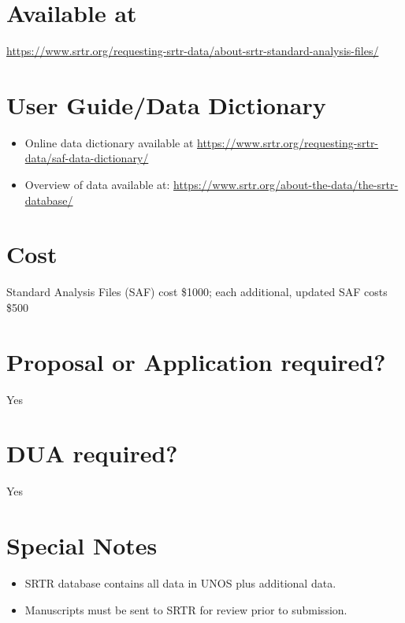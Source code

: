 \documentclass[
]{book}
\providecommand{\tightlist}{%
  \setlength{\itemsep}{0pt}\setlength{\parskip}{0pt}}
\begin{document}
\hypertarget{available-at-76}{%
\section{Available at}\label{available-at-76}}

\url{https://www.srtr.org/requesting-srtr-data/about-srtr-standard-analysis-files/}

\hypertarget{user-guidedata-dictionary-76}{%
\section{User Guide/Data Dictionary}\label{user-guidedata-dictionary-76}}

\begin{itemize}
\tightlist
\item
  Online data dictionary available at \url{https://www.srtr.org/requesting-srtr-data/saf-data-dictionary/}
\item
  Overview of data available at: \url{https://www.srtr.org/about-the-data/the-srtr-database/}
\end{itemize}

\hypertarget{cost-76}{%
\section{Cost}\label{cost-76}}

Standard Analysis Files (SAF) cost \$1000; each additional, updated SAF costs \$500

\hypertarget{proposal-or-application-required-76}{%
\section{Proposal or Application required?}\label{proposal-or-application-required-76}}

Yes

\hypertarget{dua-required-76}{%
\section{DUA required?}\label{dua-required-76}}

Yes

\hypertarget{special-notes-76}{%
\section{Special Notes}\label{special-notes-76}}

\begin{itemize}
\tightlist
\item
  SRTR database contains all data in UNOS plus additional data.
\item
  Manuscripts must be sent to SRTR for review prior to submission.
\end{itemize}
\end{document}

